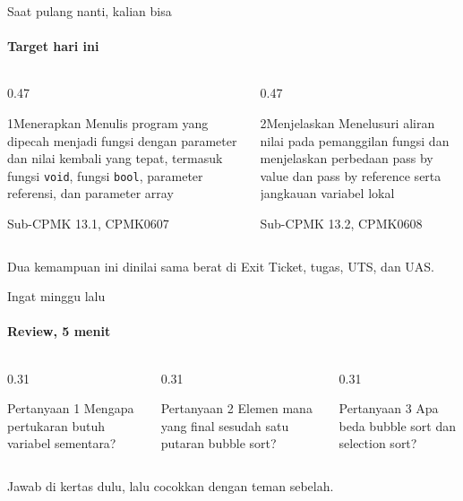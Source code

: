 \documentclass[t]{beamer}
\begin{document}
\begin{frame}{Saat pulang nanti, kalian bisa}
\framesubtitle{Target hari ini}
\begin{columns}[T]
\begin{column}{0.47\textwidth}
\begin{Langkah}{1}{Menerapkan}
Menulis program yang dipecah menjadi fungsi dengan parameter dan nilai kembali yang tepat, termasuk fungsi \texttt{void}, fungsi \texttt{bool}, parameter referensi, dan parameter array

{\footnotesize\color{ITERAInkMuted}Sub-CPMK 13.1, CPMK0607}
\end{Langkah}
\end{column}
\begin{column}{0.47\textwidth}
\begin{Langkah}{2}{Menjelaskan}
Menelusuri aliran nilai pada pemanggilan fungsi dan menjelaskan perbedaan pass by value dan pass by reference serta jangkauan variabel lokal

{\footnotesize\color{ITERAInkMuted}Sub-CPMK 13.2, CPMK0608}
\end{Langkah}
\end{column}
\end{columns}
\vspace{8pt}
\begin{Catatan}
Dua kemampuan ini dinilai sama berat di Exit Ticket, tugas, UTS, dan UAS.
\end{Catatan}
\end{frame}

\begin{frame}{Ingat minggu lalu}
\framesubtitle{Review, 5 menit}
\begin{columns}[T]
\begin{column}{0.31\textwidth}
\begin{BlokGelap}{Pertanyaan 1}
Mengapa pertukaran butuh variabel sementara?
\end{BlokGelap}
\end{column}
\begin{column}{0.31\textwidth}
\begin{BlokGelap}{Pertanyaan 2}
Elemen mana yang final sesudah satu putaran bubble sort?
\end{BlokGelap}
\end{column}
\begin{column}{0.31\textwidth}
\begin{BlokGelap}{Pertanyaan 3}
Apa beda bubble sort dan selection sort?
\end{BlokGelap}
\end{column}
\end{columns}
\vspace{8pt}
Jawab di kertas dulu, lalu cocokkan dengan teman sebelah.
\end{frame}
\end{document}
